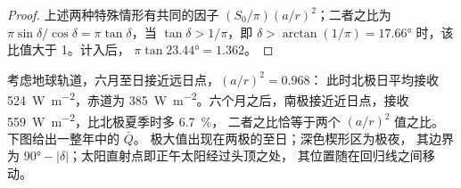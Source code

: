 \begin{proof}
上述两种特殊情形有共同的因子 $(S_0/\pi)(a/r)^2$；二者之比为
$\pi\sin\delta/\cos\delta = \pi\tan\delta$，当 $\tan\delta >
1/\pi$，即 $\delta > \arctan(1/\pi) = \ang{17.66}$ 时，该比值大于 1。计入后，
$\pi\tan\ang{23.44} = 1.362$。
\end{proof}

考虑地球轨道，六月至日接近远日点，$(a/r)^2 = 0.968$：
此时北极日平均接收 \qty{524}{W.m^{-2}}，赤道为
\qty{385}{W.m^{-2}}。六个月之后，南极接近近日点，接收
\qty{559}{W.m^{-2}}，比北极夏季时多 \qty{6.7}{\percent}，
二者之比恰等于两个 $(a/r)^2$ 值之比。下图给出一整年中的 $\bar Q$。
极大值出现在两极的至日；深色楔形区为极夜，
其边界为 $\ang{90} -
|\delta|$；太阳直射点即正午太阳经过头顶之处，
其位置随在回归线之间移动。

